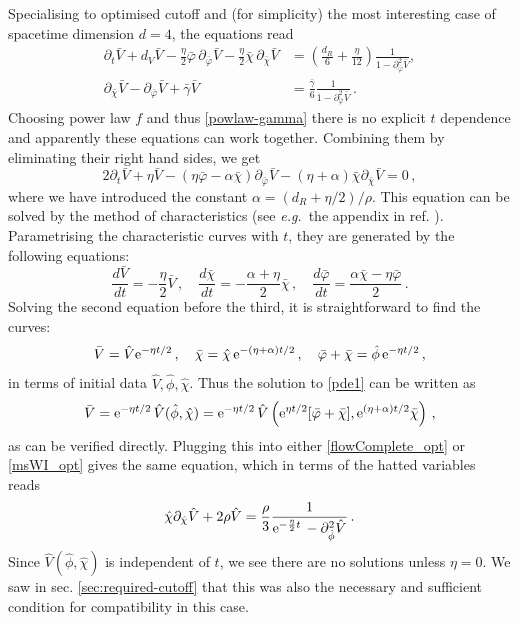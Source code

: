 \documentclass[11pt,a4paper]{article}
\numberwithin{figure}{section}
\numberwithin{equation}{section}
\newcommand\eg{\textit{e.g.}\ }
\newcommand{\be}{\begin{equation}}
\newcommand{\ee}{\end{equation}}
\newcommand{\bp}{\bar \varphi} %
\newcommand{\bc}{\bar \chi} %
\newcommand{\bV}{\bar V} %
\newcommand{\bg}{\bar \gamma} %
\newcommand{\hV}{\hat V} %
\newcommand{\hp}{\hat \phi} %
\newcommand{\hc}{\hat \chi} %
\begin{document}
Specialising to optimised cutoff and (for simplicity) the most interesting case of spacetime dimension $d=4$, the equations read
\begin{align}
\label{flowComplete_opt}
\partial_t\bar{V}+
d_V \bar V - \frac{\eta}{2} \bar \varphi \, \partial_{\bar\varphi}\bar V -\frac{\eta}{2} \bar \chi \, \partial_{\bar\chi}\bar V &= \left(  \frac{d_R}{6} + \frac{\eta}{12} \right) \frac{1}{1 -  \partial^2_{\bar\varphi}\bar V},\\
\label{msWI_opt}
\partial_{\bar\chi}\bar V - \partial_{\bar\varphi}\bar V + \bar{\gamma} \bar V &= \frac{\bar{\gamma}}{6} \frac{1}{1 - \partial^2_{\bar\varphi}\bar V}\,.
\end{align}
Choosing power law $f$ and thus \eqref{powlaw-gamma} there is no explicit $t$ dependence and apparently these equations can work together. 
Combining them %
by eliminating their right hand sides, we get
\be
\label{pde1}
2\partial_t\bar{V}+\eta\bar{V}-\left(\eta\bar\varphi-\alpha\bc\right)\partial_{\bar{\varphi}}\bar{V}-(\eta+\alpha)\bar\chi\partial_{\bar{\chi}} \bar{V}=0\,,
\ee
where we have introduced the constant $\alpha = (d_R+\eta/2)/\rho$.
This equation can be solved by the method of characteristics (see \eg the appendix in ref. \cite{Dietz:2015owa}). Parametrising the characteristic curves with $t$, they are generated by the following equations:
\be 
\frac{d\bV}{dt} = -\frac{\eta}{2}\bV\,,\quad\frac{d\bc}{dt}=-\frac{\alpha+\eta}{2}\bc\,,\quad \frac{d\bp}{dt}=\frac{\alpha\bc-\eta\bp}{2}\,.
\ee
Solving the second equation before the third, it is straightforward to find the curves:
\be 
\bV = \hV {\rm e}^{-\eta t/2}\,,\quad \bc = \hc\, {\rm e}^{-(\eta+\alpha)t/2}\,,\quad \bp+\bc = \hp\, {\rm e}^{-\eta t/2}\,,
\ee
in terms of initial data $\hV,\hp,\hc$.
Thus the solution to \eqref{pde1} can be written as
\be 
\bV ={\rm e}^{-\eta t/2}\, \hV(\hp,\hc) ={\rm e}^{-\eta t/2} \,\hV\left({\rm e}^{\eta t/2}[\bp+\bc],{\rm e}^{(\eta+\alpha)t/2}\bc\right)\,,
\ee
as can be verified directly. Plugging this into either \eqref{flowComplete_opt} or \eqref{msWI_opt} gives the same equation, which in terms of the hatted variables reads
\be 
\hc \partial_{\hc}\hV+2\rho\hV = \frac{\rho}{3}\frac{1}{{\rm e}^{-\frac{\eta}{2} t} \,-\partial^2_{\hp}\hV}\,.
\ee
Since $\hV(\hp,\hc)$ is independent of $t$, we see there are no solutions unless $\eta=0$. 
We saw in sec. \ref{sec:required-cutoff} that this was also the necessary and sufficient condition for compatibility in this case. 
\end{document}
